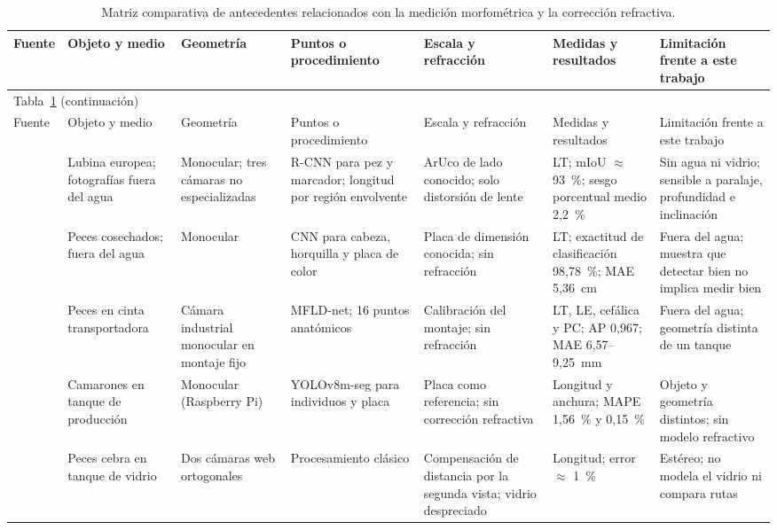 
\begin{longtable}{@{}p{2.2cm}p{2.6cm}p{2.4cm}p{2.8cm}p{2.8cm}p{3.0cm}p{3.2cm}@{}}
\caption{Matriz comparativa de antecedentes relacionados con la medición morfométrica y la corrección refractiva.}
\label{tab:antecedentes}\\
\toprule
Fuente & Objeto y medio & Geometría & Puntos o procedimiento & Escala y refracción & Medidas y resultados & Limitación frente a este trabajo \\
\midrule
\endfirsthead
\multicolumn{7}{l}{\small Tabla~\ref{tab:antecedentes} (continuación)}\\
\toprule
Fuente & Objeto y medio & Geometría & Puntos o procedimiento & Escala y refracción & Medidas y resultados & Limitación frente a este trabajo \\
\midrule
\endhead
\bottomrule
\endfoot
\endlastfoot
\textcite{Monkman2019} & Lubina europea; fotografías fuera del agua & Monocular; tres cámaras no especializadas & R-CNN para pez y marcador; longitud por región envolvente & ArUco de lado conocido; solo distorsión de lente & LT; mIoU $\approx$ 93~\%; sesgo porcentual medio 2,2~\% & Sin agua ni vidrio; sensible a paralaje, profundidad e inclinación \\
\textcite{Tseng2020} & Peces cosechados; fuera del agua & Monocular & CNN para cabeza, horquilla y placa de color & Placa de dimensión conocida; sin refracción & LT; exactitud de clasificación 98,78~\%; MAE 5,36~cm & Fuera del agua; muestra que detectar bien no implica medir bien \\
\textcite{Saleh2023} & Peces en cinta transportadora & Cámara industrial monocular en montaje fijo & MFLD-net; 16 puntos anatómicos & Calibración del montaje; sin refracción & LT, LE, cefálica y PC; AP 0,967; MAE 6,57--9,25~mm & Fuera del agua; geometría distinta de un tanque \\
\textcite{Correia2025} & Camarones en tanque de producción & Monocular (Raspberry Pi) & YOLOv8m-seg para individuos y placa & Placa como referencia; sin corrección refractiva & Longitud y anchura; MAPE 1,56~\% y 0,15~\% & Objeto y geometría distintos; sin modelo refractivo \\
\textcite{AlJubouri2017} & Peces cebra en tanque de vidrio & Dos cámaras web ortogonales & Procesamiento clásico & Compensación de distancia por la segunda vista; vidrio despreciado & Longitud; error $\approx$ 1~\% & Estéreo; no modela el vidrio ni compara rutas \\

\end{longtable}
